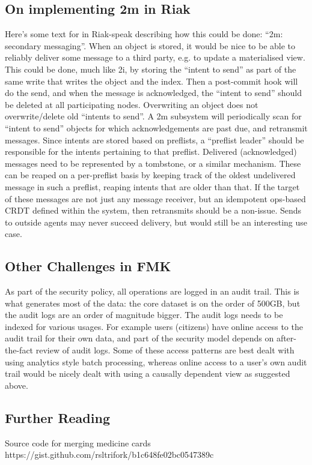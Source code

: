 \documentclass[11pt,a4paper]{report}
\begin{document}
\subsection{On implementing 2m in Riak}
Here's some text for in Riak-speak describing how this could be done: ``2m: secondary messaging''. When an object is stored, it would be nice to be able to reliably deliver some message to a third party, e.g. to update a materialised view.
This could be done, much like 2i, by storing the ``intent to send'' as part of the same write that writes the object and the index. Then a post-commit hook will do the send, and when the message is acknowledged, the ``intent to send'' should be deleted at all participating nodes.
Overwriting an object does not overwrite/delete old ``intents to send''. A 2m subsystem will periodically scan for ``intent to send'' objects for which acknowledgements are past due, and retransmit messages. Since intents are stored based on preflists, a ``preflist leader'' should be responsible for the intents pertaining to that preflist.
Delivered (acknowledged) messages need to be represented by a tombstone, or a similar mechanism.
These can be reaped on a per-preflist basis by keeping track of the oldest undelivered message in such a preflist, reaping intents that are older than that.
If the target of these messages are not just any message receiver, but an idempotent ops-based CRDT defined within the system, then retransmits should be a non-issue. Sends to outside agents may never succeed delivery, but would still be an interesting use case.

\subsection{Other Challenges in FMK}
As part of the security policy, all operations are logged in an audit trail. This is what generates most of the data: the core dataset is on the order of 500GB, but the audit logs are an order of magnitude bigger.
The audit logs needs to be indexed for various usages. For example users (citizens) have online access to the audit trail for their own data, and part of the security model depends on after-the-fact review of audit logs. Some of these access patterns are best dealt with using analytics style batch processing, whereas online access to a user's own audit trail would be nicely dealt with using a causally dependent view as suggested above.

\subsection{Further Reading}
Source code for merging medicine cards
https://gist.github.com/rsltrifork/b1c648fe02bc0547389c
\end{document}
